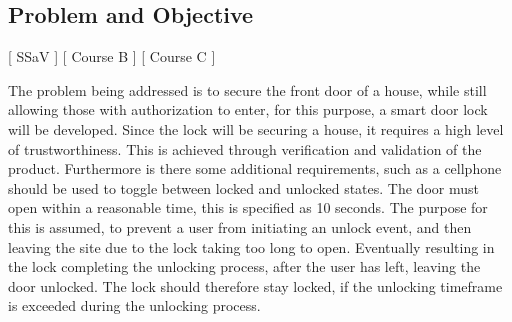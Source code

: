 \subsection{Problem and Objective}
[ SSaV ] [ Course B ] [ Course C ] 
\newline
[ Casper ] [ Author B ] [ Author C ] 
\newline






The problem being addressed is to secure the front door of a house, while still allowing those with authorization to enter, for this purpose, a smart door lock will be developed.
Since the lock will be securing a house, it requires a high level of trustworthiness.
This is achieved through verification and validation of the product.
Furthermore is there some additional requirements, such as a cellphone should be used to toggle between locked and unlocked states.
The door must open within a reasonable time, this is specified as 10 seconds.
The purpose for this is assumed, to prevent a user from initiating an unlock event, and then leaving the site due to the lock taking too long to open.
Eventually resulting in the lock completing the unlocking process, after the user has left, leaving the door unlocked.
The lock should therefore stay locked, if the unlocking timeframe is exceeded during the unlocking process.